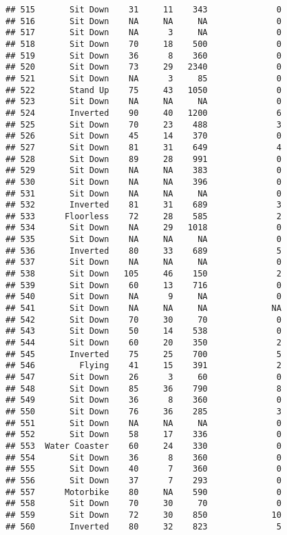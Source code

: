 \documentclass[
]{article}
\begin{document}
\begin{verbatim}
## 515       Sit Down    31     11    343              0
## 516       Sit Down    NA     NA     NA              0
## 517       Sit Down    NA      3     NA              0
## 518       Sit Down    70     18    500              0
## 519       Sit Down    36      8    360              0
## 520       Sit Down    73     29   2340              0
## 521       Sit Down    NA      3     85              0
## 522       Stand Up    75     43   1050              0
## 523       Sit Down    NA     NA     NA              0
## 524       Inverted    90     40   1200              6
## 525       Sit Down    70     23    488              3
## 526       Sit Down    45     14    370              0
## 527       Sit Down    81     31    649              4
## 528       Sit Down    89     28    991              0
## 529       Sit Down    NA     NA    383              0
## 530       Sit Down    NA     NA    396              0
## 531       Sit Down    NA     NA     NA              0
## 532       Inverted    81     31    689              3
## 533      Floorless    72     28    585              2
## 534       Sit Down    NA     29   1018              0
## 535       Sit Down    NA     NA     NA              0
## 536       Inverted    80     33    689              5
## 537       Sit Down    NA     NA     NA              0
## 538       Sit Down   105     46    150              2
## 539       Sit Down    60     13    716              0
## 540       Sit Down    NA      9     NA              0
## 541       Sit Down    NA     NA     NA             NA
## 542       Sit Down    70     30     70              0
## 543       Sit Down    50     14    538              0
## 544       Sit Down    60     20    350              2
## 545       Inverted    75     25    700              5
## 546         Flying    41     15    391              2
## 547       Sit Down    26      3     60              0
## 548       Sit Down    85     36    790              8
## 549       Sit Down    36      8    360              0
## 550       Sit Down    76     36    285              3
## 551       Sit Down    NA     NA     NA              0
## 552       Sit Down    58     17    336              0
## 553  Water Coaster    60     24    330              0
## 554       Sit Down    36      8    360              0
## 555       Sit Down    40      7    360              0
## 556       Sit Down    37      7    293              0
## 557      Motorbike    80     NA    590              0
## 558       Sit Down    70     30     70              0
## 559       Sit Down    72     30    850             10
## 560       Inverted    80     32    823              5

\end{verbatim}
\end{document}

